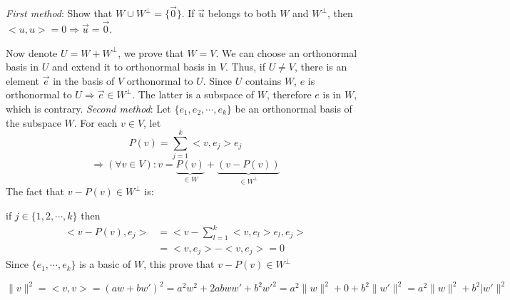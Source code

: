 			 \textit{First method}: Show that $W \cup W^\perp = \{\vec{0}\}$. If $\vec{u}$ belongs to both $W$ and $W^\perp$, then $<u, u> = 0 \Rightarrow \vec{u} = \vec{0}$.
			
			Now denote $U = W + W^\perp$, we prove that $W = V$. We can choose an orthonormal basis in $U$ and extend it to orthonormal basis in $V$. Thus, if $U \neq V$, there is an element $\vec{e}$ in the basis of $V$ orthonormal to $U$. Since $U$ contains $W$, $e$ is orthonormal to $U \Rightarrow \vec{e} \in W^\perp$. The latter is a subspace of $W$, therefore $e$ is in $W$, which is contrary.
			 \textit{Second method}: Let $\{e_1, e_2, \cdots, e_k\}$ be an orthonormal basis of the subspace $W$. For each $v \in V$, let $$P(v) = \sum_{j=1}^{k} <v, e_j> e_j$$ $$\Rightarrow (\forall v \in V): v = \underbrace{P(v)}_{\in W} + \underbrace{(v - P(v))}_{\in W^\perp}$$
			The fact that $v - P(v) \in W^\perp$ is: 
			
			if $j \in \{1, 2, \cdots, k\}$ then 
			\begin{align*}
				<v-P(v), e_j> & = <v - \sum_{l=1}^{k}<v, e_l>e_l, e_j> \\
					& = <v, e_j> - <v, e_j> = 0	
			\end{align*}
			Since $\{e_1, \cdots, e_k\}$ is a basic of $W$, this prove that $v-P(v) \in W^\perp$
		
		 $\lVert v \rVert^2 = <v, v> = (aw + bw')^2 = a^2w^2 + 2abww' + b^2w'^2 = a^2 \lVert w \rVert^2 + 0 + b^2 \lVert w' \rVert^2 = a^2 \lVert w \rVert^2 + b^2 \lvert w' \rVert^2$
	
